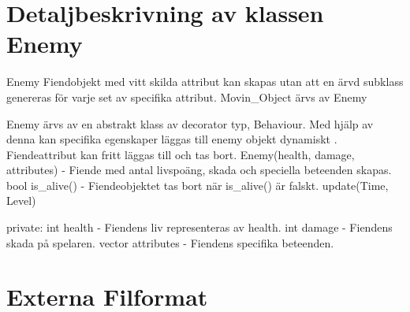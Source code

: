 \documentclass{TDP005mall}
\begin{document}
\section{Detaljbeskrivning av klassen Enemy}


Enemy 
Fiendobjekt med vitt skilda attribut kan skapas utan att en ärvd subklass genereras för varje set av specifika attribut. 
Movin\_Object ärvs av Enemy

Enemy ärvs av en abstrakt klass av decorator typ, Behaviour. Med hjälp av denna kan specifika egenskaper läggas till enemy objekt dynamiskt \textcite[p.196]{Design Patterns}. Fiendeattribut kan fritt läggas till och tas bort.
Enemy(health, damage, attributes) - Fiende med antal livspoäng, skada och speciella beteenden skapas.
bool is\_alive() -  Fiendeobjektet tas bort när is\_alive() är falskt.
update(Time, Level)

private:
int health - Fiendens liv representeras av health.
int damage - Fiendens skada på spelaren.
vector attributes - Fiendens specifika beteenden.


\section{Externa Filformat}

\newpage
\printbibliography
\end{document}
